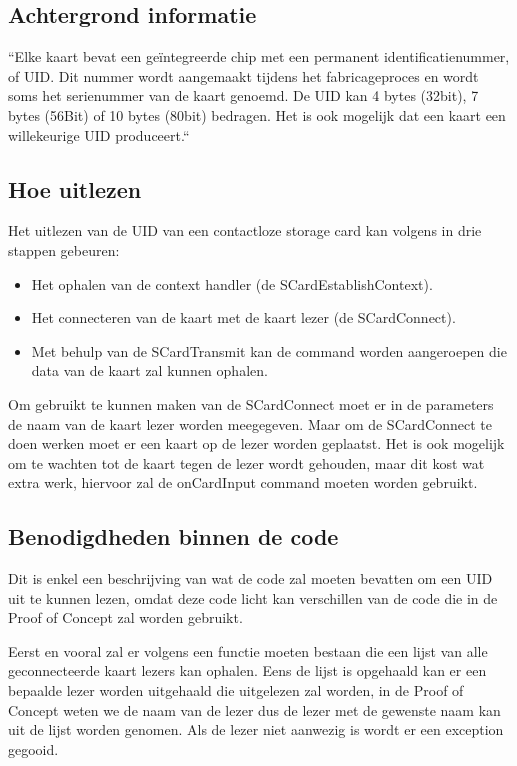 \subsection{Achtergrond informatie}
``Elke kaart bevat een geïntegreerde chip met een permanent identificatienummer, of UID. Dit nummer wordt aangemaakt tijdens het fabricageproces en wordt soms het serienummer van de kaart genoemd. De UID kan 4 bytes (32bit), 7 bytes (56Bit) of 10 bytes (80bit) bedragen. Het is ook mogelijk dat een kaart een willekeurige UID produceert.``\autocite{SmartcardFocus}

\subsection{Hoe uitlezen}
Het uitlezen van de UID van een contactloze storage card kan volgens \textcite{SmartcardFocus} in drie stappen gebeuren:
\begin{itemize}
    \item Het ophalen van de context handler (de SCardEstablishContext). 
    \item Het connecteren van de kaart met de kaart lezer (de SCardConnect). 
    \item Met behulp van de SCardTransmit kan de command worden aangeroepen die data van de kaart zal kunnen ophalen. 
\end{itemize}
Om gebruikt te kunnen maken van de SCardConnect moet er in de parameters de naam van de kaart lezer worden meegegeven. Maar om de SCardConnect te doen werken moet er een kaart op de lezer worden geplaatst. Het is ook mogelijk om te wachten tot de kaart tegen de lezer wordt gehouden, maar dit kost wat extra werk, hiervoor zal de onCardInput command moeten worden gebruikt.

\subsection{Benodigdheden binnen de code}
Dit is enkel een beschrijving van wat de code zal moeten bevatten om een UID uit te kunnen lezen, omdat deze code licht kan verschillen van de code die in de Proof of Concept zal worden gebruikt. 

Eerst en vooral zal er volgens \textcite{SmartcardFocus} een functie moeten bestaan die een lijst van alle geconnecteerde kaart lezers kan ophalen. Eens de lijst is opgehaald kan er een bepaalde lezer worden uitgehaald die uitgelezen zal worden, in de Proof of Concept weten we de naam van de lezer dus de lezer met de gewenste naam kan uit de lijst worden genomen. Als de lezer niet aanwezig is wordt er een exception gegooid.

